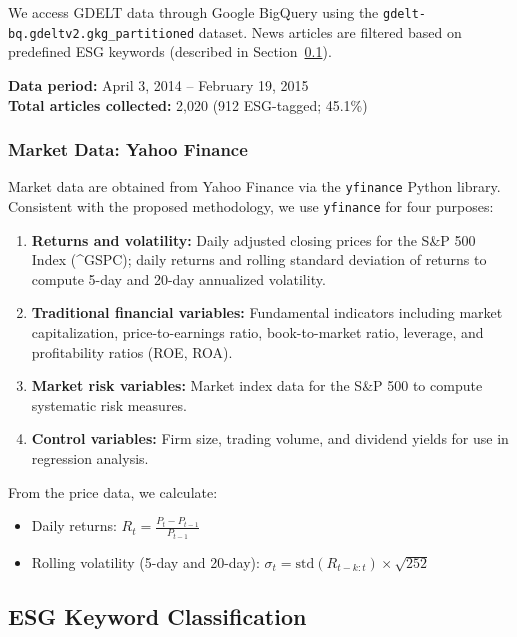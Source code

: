 \documentclass[12pt,a4paper]{article}
\newcommand{\code}[1]{\texttt{#1}}
\newcommand{\secref}[1]{Section~\ref{#1}}
\begin{document}
We access GDELT data through Google BigQuery using the \code{gdelt-bq.gdeltv2.gkg\_partitioned} dataset. News articles are filtered based on predefined ESG keywords (described in \secref{subsec:keywords}).

\textbf{Data period:} April 3, 2014 -- February 19, 2015 \\
\textbf{Total articles collected:} 2,020 (912 ESG-tagged; 45.1\%)

\subsubsection{Market Data: Yahoo Finance}
\label{subsubsec:yfinance}

Market data are obtained from Yahoo Finance via the \code{yfinance} Python library. Consistent with the proposed methodology, we use \code{yfinance} for four purposes:

\begin{enumerate}[itemsep=0.3em]
    \item \textbf{Returns and volatility:} Daily adjusted closing prices for the S\&P 500 Index (\^{}GSPC); daily returns and rolling standard deviation of returns to compute 5-day and 20-day annualized volatility.
    \item \textbf{Traditional financial variables:} Fundamental indicators including market capitalization, price-to-earnings ratio, book-to-market ratio, leverage, and profitability ratios (ROE, ROA).
    \item \textbf{Market risk variables:} Market index data for the S\&P 500 to compute systematic risk measures.
    \item \textbf{Control variables:} Firm size, trading volume, and dividend yields for use in regression analysis.
\end{enumerate}

From the price data, we calculate:
\begin{itemize}[itemsep=0.3em]
    \item Daily returns: $R_t = \frac{P_t - P_{t-1}}{P_{t-1}}$
    \item Rolling volatility (5-day and 20-day): $\sigma_t = \text{std}(R_{t-k:t}) \times \sqrt{252}$
\end{itemize}

\subsection{ESG Keyword Classification}
\label{subsec:keywords}
\end{document}
